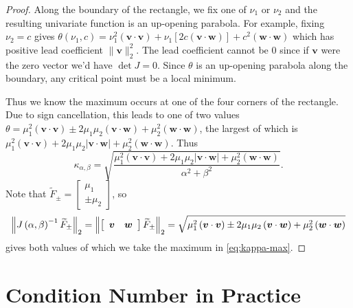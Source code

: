 \documentclass[3p, authoryear, square]{elsarticle}
\theoremstyle{definition}
\begin{document}
\begin{proof}
Along the boundary of the rectangle,
we fix one of \(\nu_1\) or \(\nu_2\) and the resulting univariate function is
an up-opening parabola. For example, fixing \(\nu_2 = c\) gives
\(\theta(\nu_1, c) =
\nu_1^2 \left(\bm{v} \cdot \bm{v}\right) +
\nu_1\left[2 c \left(\bm{v} \cdot \bm{w}\right)\right] +
c^2 \left(\bm{w} \cdot \bm{w}\right)\) which has positive lead coefficient
\(\|\bm{v}\|_2^2\). The lead coefficient cannot be \(0\) since if \(\bm{v}\)
were the zero vector we'd have \(\det J = 0\).
Since \(\theta\) is an up-opening parabola along the boundary, any critical
point must be a local minimum.

Thus we know the maximum occurs at one of the four corners of the
rectangle. Due to sign cancellation, this leads to one of two values
\(\theta =
\mu_1^2 \left(\bm{v} \cdot \bm{v}\right) \pm
2 \mu_1 \mu_2 \left(\bm{v} \cdot \bm{w}\right) +
\mu_2^2 \left(\bm{w} \cdot \bm{w}\right)\), the largest of which is
\(\mu_1^2 \left(\bm{v} \cdot \bm{v}\right) +
2 \mu_1 \mu_2 \left|\bm{v} \cdot \bm{w}\right| +
\mu_2^2 \left(\bm{w} \cdot \bm{w}\right)\). Thus
\begin{equation}\label{eq:intersect-cond-num-too}
\kappa_{\alpha, \beta} = \sqrt{\frac{\mu_1^2
  \left(\bm{v} \cdot \bm{v}\right) +
  2 \mu_1 \mu_2 \left|\bm{v} \cdot \bm{w}\right| +
  \mu_2^2 \left(\bm{w} \cdot \bm{w}\right)}{\alpha^2 + \beta^2}}.
\end{equation}
Note that \(\widetilde{F}_{\pm} = \left[ \begin{array}{c} \mu_1 \\ \pm \mu_2
\end{array}\right]\), so
\begin{equation}
\left \lVert J\left(\alpha, \beta\right)^{-1} \widetilde{F}_{\pm}
  \right \rVert_2 = \left \lVert \left[ \begin{array}{c c} \bm{v} & \bm{w}
  \end{array}\right] \widetilde{F}_{\pm} \right \rVert_2 =
  \sqrt{\mu_1^2 \left(\bm{v} \cdot \bm{v}\right) \pm
  2 \mu_1 \mu_2 \left(\bm{v} \cdot \bm{w}\right) +
  \mu_2^2 \left(\bm{w} \cdot \bm{w}\right)}
\end{equation}
gives both values of which we take the maximum in \eqref{eq:kappa-max}.
\end{proof}

\section{Condition Number in Practice}
\end{document}
